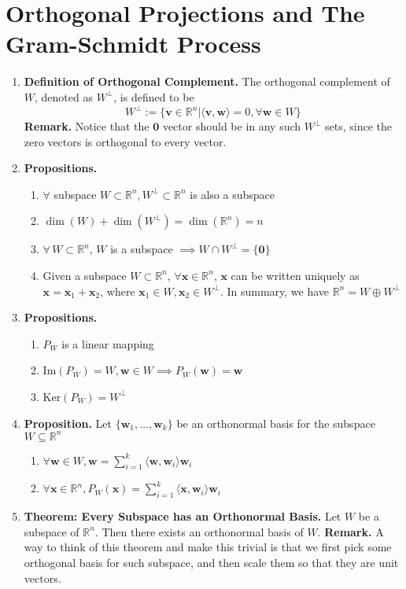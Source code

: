 \documentclass[oneside, 12pt]{book}
\newcommand{\settag}[1]{\renewcommand{\theenumi}{#1}}
\newcommand{\R}{\mathbb{R}}
\newcommand{\tbf}[1]{\textbf{#1}}
\newcommand{\para}[1]{\item \tbf{#1}}
\newcommand{\vv}{\mathbf{v}}
\newcommand{\vw}{\mathbf{w}}
\newcommand{\vx}{\mathbf{x}}
\newcommand{\vzero}{\mathbf{0}}
\begin{document}
\section{Orthogonal Projections and The Gram-Schmidt Process}
\begin{enumerate}
    \settag{4.4.1}
    \para{Definition of Orthogonal Complement.} The orthogonal complement of $W$, denoted as $W^{\perp}$, is defined to be
    \begin{equation*}
        W^\perp := \{\vv\in \R^n | \langle \vv,\vw\rangle = 0, \forall \vw \in W\}
    \end{equation*}
    \textbf{Remark.} Notice that the $\vzero$ vector should be in any such $W^\perp$ sets, since the zero vectors is orthogonal to every vector.
    
    \settag{4.4.3}
    \para{Propositions.}
    \begin{enumerate}
        \item $\forall$ subspace $W \subset \R^n, W^\perp\subset \R^n$ is also a subspace
        \item $\dim(W) + \dim(W^\perp) = \dim(\R^n) = n$
        \item $\forall\, W\subset \R^n$, $W$ is a subspace $\implies W \cap W^\perp = \{\vzero\}$
        \item Given a subspace $W\subset \R^n$, $\forall \vx \in \R^n$, $\vx$ can be written uniquely as $\vx = \vx_1 + \vx_2$, where $\vx_1 \in W, \vx_2 \in W^\perp$. In summary, we have $\R^n = W \oplus W^\perp$
    \end{enumerate}
    
    \settag{4.4.5}
    \para{Propositions.}
    \begin{enumerate}
        \item $P_W$ is a linear mapping
        \item Im$(P_W) = W, \vw \in W \implies P_W(\vw) = \vw$
        \item Ker$(P_W) = W^\perp$
    \end{enumerate}
    
    \settag{4.4.6}
    \para{Proposition.} Let $\{\vw_1,...,\vw_k\}$ be an orthonormal basis for the subspace $W \subseteq \R^n$
    \begin{enumerate}
        \item 
        $
            \forall \vw \in W, \vw = \sum_{i = 1}^k \langle \vw,\vw_i \rangle \vw_i
        $
        \item 
        $
            \forall \vx \in \R^n, P_W(\vx) = \sum_{i = 1}^k \langle \vx,\vw_i \rangle \vw_i
        $
    \end{enumerate}
    
    \settag{4.4.9}
    \para{Theorem: Every Subspace has an Orthonormal Basis.} Let $W$ be a subspace of $\R^n$. Then there exists an orthonormal basis of $W$. \newline 
    \textbf{Remark.} A way to think of this theorem and make this trivial is that we first pick some orthogonal basis for such subspace, and then scale them so that they are unit vectors.
    
    
    
    
\end{enumerate}
\end{document}
